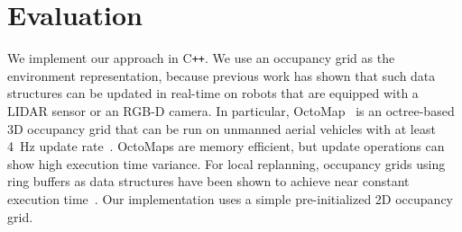 \documentclass{svproc}
\newcommand{\todo}[1]{\textbf{\textcolor{red}{TODO: #1}}}
\begin{document}



\section{Evaluation} \label{evaluationSection}

We implement our approach in C\texttt{++}.
We use an occupancy grid as the environment representation, because previous work has shown that such data structures can be updated in real-time on robots that are equipped with a LIDAR sensor or an RGB-D camera.
In particular, OctoMap~\cite{octomap} is an octree-based 3D occupancy grid that can be run on unmanned aerial vehicles with at least \SI{4}{Hz} update rate~\cite{replanning-eth}.
OctoMaps are memory efficient, but update operations can show high execution time variance.
For local replanning, occupancy grids using ring buffers as data structures have been shown to achieve near constant execution time~\cite{replanning-usenko}.
Our implementation uses a simple pre-initialized 2D occupancy grid.
\end{document}
